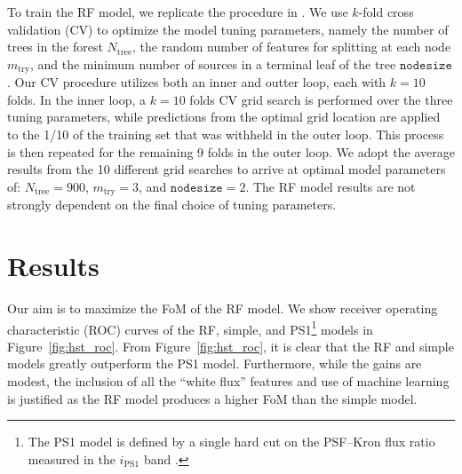 \documentclass[twocolumn]{aastex63}
\begin{document}
To train the RF model, we replicate the procedure in \citet{Tachibana18}. We
use $k$-fold cross validation (CV) to optimize the model tuning parameters,
namely the number of trees in the forest $N_\mathrm{tree}$, the random number
of features for splitting at each node $m_\mathrm{try}$, and the minimum
number of sources in a terminal leaf of the tree $\mathtt{nodesize}$. Our CV
procedure utilizes both an inner and outter loop, each with $k = 10$ folds. In
the inner loop, a $k = 10$ folds CV grid search is performed over the three
tuning parameters, while predictions from the optimal grid location are
applied to the 1/10 of the training set that was withheld in the outer loop.
This process is then repeated for the remaining 9 folds in the outer loop. We
adopt the average results from the 10 different grid searches to arrive at
optimal model parameters of: $N_\mathrm{tree} = 900$, $m_\mathrm{try}
= 3$, and $\mathtt{nodesize} = 2$. The RF model results are not strongly
dependent on the final choice of tuning parameters.

\section{Results}\label{sec:results}

Our aim is to maximize the FoM of the RF model. We show receiver operating
characteristic (ROC) curves of the RF, simple, and PS1\footnote{The PS1 model
is defined by a single hard cut on the PSF--Kron flux ratio measured in the
$i_\mathrm{PS1}$ band \citep[for further details see][]{Tachibana18}.} models
in Figure~\ref{fig:hst_roc}. From Figure~\ref{fig:hst_roc}, it is clear that
the RF and simple models greatly outperform the PS1 model. Furthermore, while
the gains are modest, the inclusion of all the ``white flux'' features and use
of machine learning is justified as the RF model produces a higher FoM than
the simple model.
\end{document}
